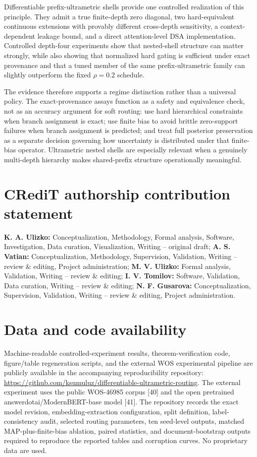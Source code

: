 \documentclass[preprint,11pt]{elsarticle}
\begin{document}
Differentiable prefix-ultrametric shells provide one controlled realization of this principle. They admit a true finite-depth zero diagonal, two hard-equivalent continuous extensions with provably different cross-depth sensitivity, a context-dependent leakage bound, and a direct attention-level DSA implementation. Controlled depth-four experiments show that nested-shell structure can matter strongly, while also showing that normalized hard gating is sufficient under exact provenance and that a tuned member of the same prefix-ultrametric family can slightly outperform the fixed $\rho=0.2$ schedule.

The evidence therefore supports a regime distinction rather than a universal policy. The exact-provenance assays function as a safety and equivalence check, not as an accuracy argument for soft routing: use hard hierarchical constraints when branch assignment is exact; use finite bias to avoid brittle zero-support failures when branch assignment is predicted; and treat full posterior preservation as a separate decision governing how uncertainty is distributed under that finite-bias operator. Ultrametric nested shells are especially relevant when a genuinely multi-depth hierarchy makes shared-prefix structure operationally meaningful.

\section*{CRediT authorship contribution statement}
\textbf{K. A. Ulizko:} Conceptualization, Methodology, Formal analysis, Software, Investigation, Data curation, Visualization, Writing -- original draft; \textbf{A. S. Vatian:} Conceptualization, Methodology, Supervision, Validation, Writing -- review \& editing, Project administration; \textbf{M. V. Ulizko:} Formal analysis, Validation, Writing -- review \& editing; \textbf{I. V. Tomilov:} Software, Validation, Data curation, Writing -- review \& editing; \textbf{N. F. Gusarova:} Conceptualization, Supervision, Validation, Writing -- review \& editing, Project administration.

\section*{Data and code availability}
Machine-readable controlled-experiment results, theorem-verification code, figure/table regeneration scripts, and the external WOS experimental pipeline are publicly available in the accompanying reproducibility repository: \url{https://github.com/ksumuluz/differentiable-ultrametric-routing}. The external experiment uses the public WOS-46985 corpus [40] and the open pretrained answerdotai/ModernBERT-base model [41]. The repository records the exact model revision, embedding-extraction configuration, split definition, label-consistency audit, selected routing parameters, ten seed-level outputs, matched MAP-plus-finite-bias ablation, paired statistics, and document-bootstrap outputs required to reproduce the reported tables and corruption curves. No proprietary data are used.
\end{document}

